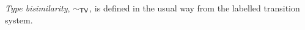 \emph{Type bisimilarity}, $\sim_{\mathsf{TV}}$, is defined in the usual way from the
labelled transition system.


